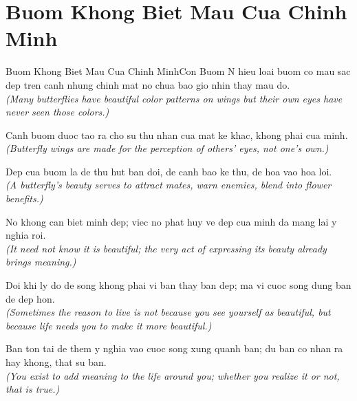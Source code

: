 \section{Buom Khong Biet Mau Cua Chinh Minh}
\begin{truyen}{Buom Khong Biet Mau Cua Chinh Minh}{Con Buom}
N hieu loai buom co mau sac dep tren canh nhung chinh mat no chua bao gio nhin thay mau do.\\
\textit{(Many butterflies have beautiful color patterns on wings but their own eyes have never seen those colors.)}

Canh buom duoc tao ra cho su thu nhan cua mat ke khac, khong phai cua minh.\\
\textit{(Butterfly wings are made for the perception of others' eyes, not one's own.)}

Dep cua buom la de thu hut ban doi, de canh bao ke thu, de hoa vao hoa loi.\\
\textit{(A butterfly's beauty serves to attract mates, warn enemies, blend into flower benefits.)}

No khong can biet minh dep; viec no phat huy ve dep cua minh da mang lai y nghia roi.\\
\textit{(It need not know it is beautiful; the very act of expressing its beauty already brings meaning.)}

Doi khi ly do de song khong phai vi ban thay ban dep; ma vi cuoc song dung ban de dep hon.\\
\textit{(Sometimes the reason to live is not because you see yourself as beautiful, but because life needs you to make it more beautiful.)}

\end{truyen}
\begin{baihoc}
  Ban ton tai de them y nghia vao cuoc song xung quanh ban; du ban co nhan ra hay khong, that su ban.\\
  \textit{(You exist to add meaning to the life around you; whether you realize it or not, that is true.)}
\end{baihoc}


